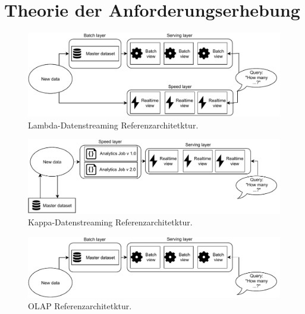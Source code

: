\section{Theorie der Anforderungserhebung}

\begin{figure}[H]
\centering
\includegraphics[width=\textwidth]{graphics/Lambda-Reference-Architecture.pdf}
\caption[Lambda-Datenstreaming Referenzarchitetktur]{Lambda-Datenstreaming Referenzarchitetktur.\footnotemark}
\label{abb:LambdaStreaming}
\end{figure}

\begin{figure}[H]
\centering
\includegraphics[width=\textwidth]{graphics/Kappa-Reference-Architecture.pdf}
\caption[Kappa-Datenstreaming Referenzarchitetktur]{Kappa-Datenstreaming Referenzarchitetktur.\footnotemark}
\label{abb:KappaStreaming}
\end{figure}

\begin{figure}[H]
\centering
\includegraphics[width=\textwidth]{graphics/OLAP-Reference-Architecture.pdf}
\caption[OLAP Referenzarchitetktur]{OLAP Referenzarchitetktur.\footnotemark}
\label{abb:OLAPStreaming}
\end{figure}
